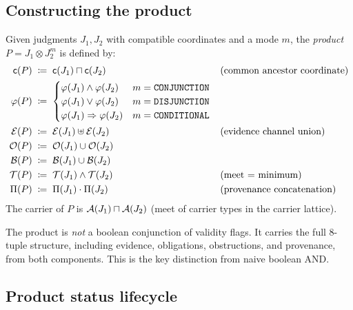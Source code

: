 \documentclass[11pt]{article}
\newcommand{\Jprod}{\mathbin{\otimes}}            %
\newcommand{\JprodN}[2]{#1 \Jprod #2}             %
\newcommand{\conj}{\mathbin{\wedge}}              %
\newcommand{\disj}{\mathbin{\vee}}                %
\newcommand{\eqdef}{\;\coloneqq\;}                %
\begin{document}
\subsection{Constructing the product}

\begin{construction}\label{const:product}
Given judgments $J_1, J_2$ with compatible coordinates and a mode
$m$, the \emph{product} $P = \JprodN{J_1}{J_2}^m$ is defined by:
\begin{align}
  \coord(P) &\eqdef \coord(J_1) \sqcap \coord(J_2)
    && \text{(common ancestor coordinate)}
  \label{eq:prod-coord} \\
  \prop(P) &\eqdef
    \begin{cases}
      \prop(J_1) \conj \prop(J_2) & m = \texttt{CONJUNCTION} \\
      \prop(J_1) \disj \prop(J_2) & m = \texttt{DISJUNCTION} \\
      \prop(J_1) \Rightarrow \prop(J_2) & m = \texttt{CONDITIONAL}
    \end{cases}
  \label{eq:prod-prop} \\
  \evid(P) &\eqdef \evid(J_1) \uplus \evid(J_2)
    && \text{(evidence channel union)}
  \label{eq:prod-evid} \\
  \oblig(P) &\eqdef \oblig(J_1) \cup \oblig(J_2)
  \label{eq:prod-oblig} \\
  \obstr(P) &\eqdef \obstr(J_1) \cup \obstr(J_2)
  \label{eq:prod-obstr} \\
  \trust(P) &\eqdef \trust(J_1) \wedge \trust(J_2)
    && \text{(meet = minimum)}
  \label{eq:prod-trust} \\
  \prov(P) &\eqdef \prov(J_1) \cdot \prov(J_2)
    && \text{(provenance concatenation)}
  \label{eq:prod-prov}
\end{align}
The carrier of $P$ is $\mathcal{A}(J_1) \sqcap \mathcal{A}(J_2)$ (meet of
carrier types in the carrier lattice).
\end{construction}

\begin{remark}
The product is \emph{not} a boolean conjunction of validity flags.
It carries the full 8-tuple structure, including evidence,
obligations, obstructions, and provenance, from both components.
This is the key distinction from naive boolean AND.
\end{remark}

\subsection{Product status lifecycle}
\end{document}
